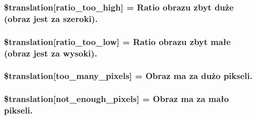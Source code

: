 \subsubsection[{\$translation}]{\setlength{\rightskip}{0pt plus 5cm}\$translation\mbox{[}\textquotesingle{}ratio\+\_\+too\+\_\+high\textquotesingle{}\mbox{]} = \textquotesingle{}Ratio obrazu zbyt duże (obraz jest za szeroki).\textquotesingle{}}\label{class_8upload_8pl___p_l_8php_a23396f6ce7f31e5e5f1b57580621d982}
\hypertarget{class_8upload_8pl___p_l_8php_ac533b9a479f056b0b8623e4268f068c2}{}
\subsubsection[{\$translation}]{\setlength{\rightskip}{0pt plus 5cm}\$translation\mbox{[}\textquotesingle{}ratio\+\_\+too\+\_\+low\textquotesingle{}\mbox{]} = \textquotesingle{}Ratio obrazu zbyt małe (obraz jest za wysoki).\textquotesingle{}}\label{class_8upload_8pl___p_l_8php_ac533b9a479f056b0b8623e4268f068c2}
\hypertarget{class_8upload_8pl___p_l_8php_aa4051ef64e94a3f8295c63cf85544016}{}
\subsubsection[{\$translation}]{\setlength{\rightskip}{0pt plus 5cm}\$translation\mbox{[}\textquotesingle{}too\+\_\+many\+\_\+pixels\textquotesingle{}\mbox{]} = \textquotesingle{}Obraz ma za dużo pikseli.\textquotesingle{}}\label{class_8upload_8pl___p_l_8php_aa4051ef64e94a3f8295c63cf85544016}
\hypertarget{class_8upload_8pl___p_l_8php_a1fe342c27ce61f4ff4e0120ba647033e}{}
\subsubsection[{\$translation}]{\setlength{\rightskip}{0pt plus 5cm}\$translation\mbox{[}\textquotesingle{}not\+\_\+enough\+\_\+pixels\textquotesingle{}\mbox{]} = \textquotesingle{}Obraz ma za mało pikseli.\textquotesingle{}}\label{class_8upload_8pl___p_l_8php_a1fe342c27ce61f4ff4e0120ba647033e}
\hypertarget{class_8upload_8pl___p_l_8php_a4ce76e7be0b3a03c2b47f6d70c21832e}{}
